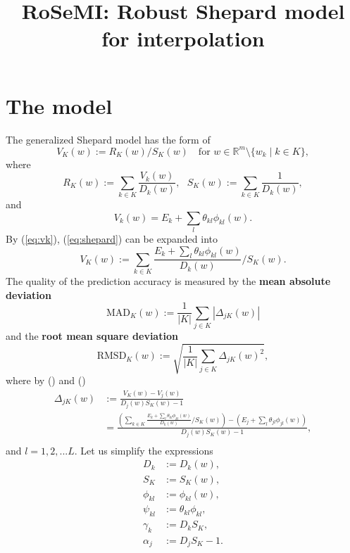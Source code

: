 \documentclass[12pt]{article}
\title{RoSeMI: Robust Shepard model for interpolation}
\def\D{\displaystyle}
\begin{document}
\maketitle


\section{The model}
The generalized Shepard model has the form of 
\begin{equation}
    \label{eq:shepard}
    V_K(w):=R_K(w)/S_K(w) ~~~ \text{ for } w \in \mathbb{R}^m \setminus \{w_k\mid k\in K \},
\end{equation}
where
\begin{equation}
    R_K(w):=\sum_{k\in K} \frac{V_k(w)}{D_k(w)},~~~
    S_K(w):=\sum_{k\in K} \frac{1}{D_k(w)},
\end{equation}
and
\begin{equation}
    \label{eq:vk}
    V_k(w) = E_k + \sum_l \theta_{kl} \phi_{kl}(w).
\end{equation}
By (\ref{eq:vk}), (\ref{eq:shepard}) can be expanded into
\begin{equation}
    \label{eq:vk_expand}
    V_K(w) := \sum_{k\in K} \frac{E_k + \sum_l \theta_{kl} \phi_{kl}(w)}{D_k(w)} / S_K(w). 
\end{equation}
The quality of the prediction accuracy is measured by the \textbf{mean absolute deviation}
\begin{equation}
    \text{MAD}_K(w) := \frac{1}{|K|}\sum_{j\in K}|\Delta_{jK}(w)|
\end{equation}
and the \textbf{root mean square deviation}
\begin{equation}
    \text{RMSD}_K(w) := \sqrt{\frac{1}{|K|}\sum_{j\in K}\Delta_{jK}(w)^2},
\end{equation}
where by () and ()
\begin{equation}
    \label{eq:delta}
    \begin{split}
        \Delta_{jK}(w)&:=\D\frac{V_K(w)-V_j(w)}{D_j(w)S_K(w)-1} \\
        &= \frac{\D \left(\sum_{k\in K} \frac{E_k + \sum_l \theta_{kl} \phi_{kl}(w)}{D_k(w)} / S_K(w)\right) - \left(E_j + \sum_l \theta_{jl} \phi_{jl}(w)\right)}{D_j(w)S_K(w)-1}, \\
    \end{split}
\end{equation}
and $l=1,2,...L$.
Let us simplify the expressions
\begin{equation*}
	\label{eq:simp}
    \begin{split}
        D_k &:= D_k(w), \\
        S_K &:= S_K(w), \\
        \phi_{kl} &:= \phi_{kl}(w),\\
        \psi_{kl} &:= \theta_{kl}\phi_{kl}, \\
        \gamma_k &:= D_kS_K, \\
        \alpha_j &:= D_jS_K-1.
    \end{split}
\end{equation*}
\end{document}
